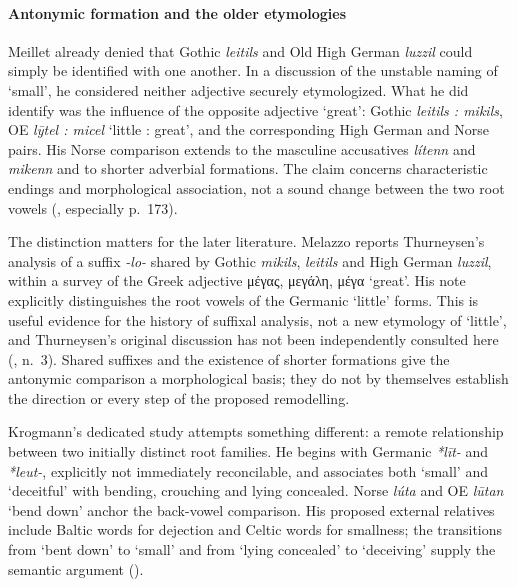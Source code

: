 \documentclass[
  british,
  a4paper,
]{article}
\begin{document}
\paragraph{Antonymic formation and the older
etymologies}\label{antonymic-formation-and-the-older-etymologies}

Meillet already denied that Gothic \emph{leitils} and Old High German
\emph{luzzil} could simply be identified with one another. In a
discussion of the unstable naming of `small', he considered neither
adjective securely etymologized. What he did identify was the influence
of the opposite adjective `great': Gothic \emph{leitils : mikils}, OE
\emph{lȳtel : micel} `little : great', and the corresponding High German
and Norse pairs. His Norse comparison extends to the masculine
accusatives \emph{lítenn} and \emph{mikenn} and to shorter adverbial
formations. The claim concerns characteristic endings and morphological
association, not a sound change between the two root vowels
(, especially p.~173).

The distinction matters for the later literature. Melazzo reports
Thurneysen's analysis of a suffix \emph{-lo-} shared by Gothic
\emph{mikils}, \emph{leitils} and High German \emph{luzzil}, within a
survey of the Greek adjective μέγας, μεγάλη, μέγα `great'. His note
explicitly distinguishes the root vowels of the Germanic `little' forms.
This is useful evidence for the history of suffixal analysis, not a new
etymology of `little', and Thurneysen's original discussion has not been
independently consulted here (, n.~3). Shared suffixes and the existence of shorter formations give
the antonymic comparison a morphological basis; they do not by
themselves establish the direction or every step of the proposed
remodelling.

Krogmann's dedicated study attempts something different: a remote
relationship between two initially distinct root families. He begins
with Germanic \emph{*līt-} and \emph{*leut-}, explicitly not immediately
reconcilable, and associates both `small' and `deceitful' with bending,
crouching and lying concealed. Norse \emph{lúta} and OE \emph{lūtan}
`bend down' anchor the back-vowel comparison. His proposed external
relatives include Baltic words for dejection and Celtic words for
smallness; the transitions from `bent down' to `small' and from `lying
concealed' to `deceiving' supply the semantic argument
().
\end{document}
